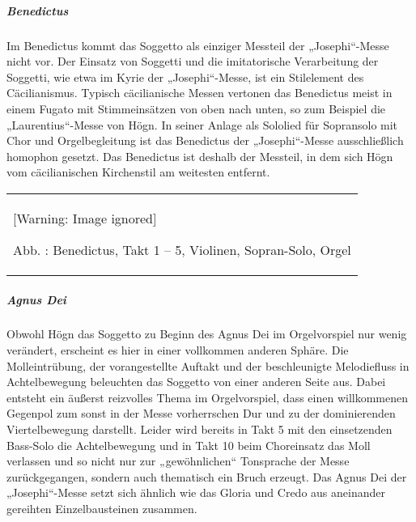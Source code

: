 \documentclass[a4paper]{article}
\newcounter{Abb}
\renewcommand\theAbb{\arabic{Abb}}
\begin{document}
\subparagraph{Benedictus}
Im Benedictus kommt das Soggetto als einziger Messteil der
„Josephi“-Messe nicht vor. Der Einsatz von Soggetti und die
imitatorische Verarbeitung der Soggetti, wie etwa im Kyrie der
„Josephi“-Messe, ist ein Stilelement des Cäcilianismus. Typisch
cäcilianische Messen vertonen das Benedictus meist in einem Fugato mit
Stimmeinsätzen von oben nach unten, so zum Beispiel die
„Laurentius“-Messe von Högn. In seiner Anlage als Sololied für
Sopransolo mit Chor und Orgelbegleitung ist das Benedictus der
„Josephi“-Messe ausschließlich homophon gesetzt. Das Benedictus ist
deshalb der Messteil, in dem sich Högn vom cäcilianischen Kirchenstil
am weitesten entfernt. 

\begin{flushleft}
\tablefirsthead{}
\tablehead{}
\tabletail{}
\tablelasttail{}
\begin{supertabular}{m{10.528cm}}
  [Warning: Image ignored] %
 
Abb. \stepcounter{Abb}{\theAbb}: Benedictus, Takt 1 – 5, Violinen,
Sopran-Solo, Orgel\\
\end{supertabular}
\end{flushleft}
\clearpage\subparagraph{Agnus Dei}
Obwohl Högn das Soggetto zu Beginn des Agnus Dei im Orgelvorspiel nur
wenig verändert, erscheint es hier in einer vollkommen anderen Sphäre.
Die Molleintrübung, der vorangestellte Auftakt und der beschleunigte
Melodiefluss in Achtelbewegung beleuchten das Soggetto von einer
anderen Seite aus. Dabei entsteht ein äußerst reizvolles Thema im
Orgelvorspiel, dass einen willkommenen Gegenpol zum sonst in der Messe
vorherrschen Dur und zu der dominierenden Viertelbewegung darstellt.
Leider wird bereits in Takt 5 mit den einsetzenden Bass-Solo die
Achtelbewegung und in Takt 10 beim Choreinsatz das Moll verlassen und
so nicht nur zur „gewöhnlichen“ Tonsprache der Messe zurückgegangen,
sondern auch thematisch ein Bruch erzeugt. Das Agnus Dei der
„Josephi“-Messe setzt sich ähnlich wie das Gloria und Credo aus
aneinander gereihten Einzelbausteinen zusammen.
\end{document}
